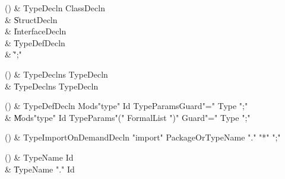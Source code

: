 \begin{bbgrammarappendix}

() & TypeDecln \label{prod:TypeDecln}  \: ClassDecln  \\

 &    \| StructDecln \\
 &    \| InterfaceDecln \\
 &    \| TypeDefDecln \\
 &    \| \xcd";" \\

\end{bbgrammarappendix}

\begin{bbgrammarappendix}

() & TypeDeclns \label{prod:TypeDeclns}  \: TypeDecln  \\

 &    \| TypeDeclns TypeDecln \\

\end{bbgrammarappendix}

\begin{bbgrammarappendix}

() & TypeDefDecln \label{prod:TypeDefDecln}  \: Mods\opt \xcd"type" Id TypeParams\opt Guard\opt \xcd"=" Type \xcd";"  \\

 &    \| Mods\opt \xcd"type" Id TypeParams\opt \xcd"(" FormalList \xcd")" Guard\opt \xcd"=" Type \xcd";" \\

\end{bbgrammarappendix}

\begin{bbgrammarappendix}

() & TypeImportOnDemandDecln \label{prod:TypeImportOnDemandDecln}  \: \xcd"import" PackageOrTypeName \xcd"." \xcd"*" \xcd";"  \\


\end{bbgrammarappendix}

\begin{bbgrammarappendix}

() & TypeName \label{prod:TypeName}  \: Id  \\

 &    \| TypeName \xcd"." Id \\

\end{bbgrammarappendix}

